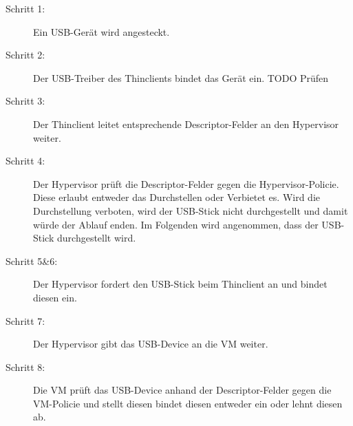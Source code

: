 \begin{description}
	\item[Schritt 1: ] Ein USB-Gerät wird angesteckt.
	\item[Schritt 2: ] Der USB-Treiber des Thinclients bindet das Gerät ein. TODO Prüfen
	\item[Schritt 3: ] Der Thinclient leitet entsprechende Descriptor-Felder an den Hypervisor weiter.
	\item[Schritt 4: ] Der Hypervisor prüft die Descriptor-Felder gegen die Hypervisor-Policie. Diese erlaubt entweder das Durchstellen oder Verbietet es. Wird die Durchstellung verboten, wird der USB-Stick nicht durchgestellt und damit würde der Ablauf enden. Im Folgenden wird angenommen, dass der USB-Stick durchgestellt wird.
	\item[Schritt 5\&6: ] Der Hypervisor fordert den USB-Stick beim Thinclient an und bindet diesen ein.
	\item[Schritt 7: ] Der Hypervisor gibt das USB-Device an die VM weiter.
	\item[Schritt 8: ] Die VM prüft das USB-Device anhand der Descriptor-Felder gegen die VM-Policie und stellt diesen bindet diesen entweder ein oder lehnt diesen ab.
\end{description}